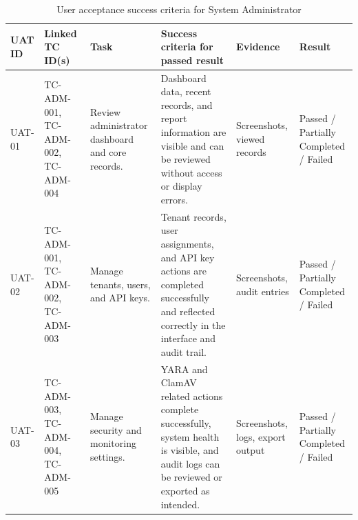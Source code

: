 \begin{table}[H]
  \centering
  \smalltable
  \scriptsize
  {%
  \setlength{\tabcolsep}{3pt}
  \renewcommand{\arraystretch}{1.18}
  \begin{tabular}{|>{\raggedright\arraybackslash}p{}|
                  >{\raggedright\arraybackslash}p{}|
                  >{\raggedright\arraybackslash}p{}|
                  >{\raggedright\arraybackslash}p{}|
                  >{\raggedright\arraybackslash}p{}|
                  >{\centering\arraybackslash}p{}|}
    \hline
    \textbf{UAT ID} &
    \textbf{Linked TC ID(s)} &
    \textbf{Task} &
    \textbf{Success criteria for passed result} &
    \textbf{Evidence} &
    \textbf{Result} \\
    \hline\hline

    UAT-01 &
    TC-ADM-001, TC-ADM-002, TC-ADM-004 &
    Review administrator dashboard and core records. &
    Dashboard data, recent records, and report information are visible and can
    be reviewed without access or display errors. &
    Screenshots, viewed records &
    Passed / Partially Completed / Failed \\
    \hline

    UAT-02 &
    TC-ADM-001, TC-ADM-002, TC-ADM-003 &
    Manage tenants, users, and API keys. &
    Tenant records, user assignments, and API key actions are completed
    successfully and reflected correctly in the interface and audit trail. &
    Screenshots, audit entries &
    Passed / Partially Completed / Failed \\
    \hline

    UAT-03 &
    TC-ADM-003, TC-ADM-004, TC-ADM-005 &
    Manage security and monitoring settings. &
    YARA and ClamAV related actions complete successfully, system health is
    visible, and audit logs can be reviewed or exported as intended. &
    Screenshots, logs, export output &
    Passed / Partially Completed / Failed \\
    \hline

  \end{tabular}
  }%
  \captionsetup{type=table}
  \caption{User acceptance success criteria for System Administrator}
  \label{tab:uat-success-admin}
\end{table}

